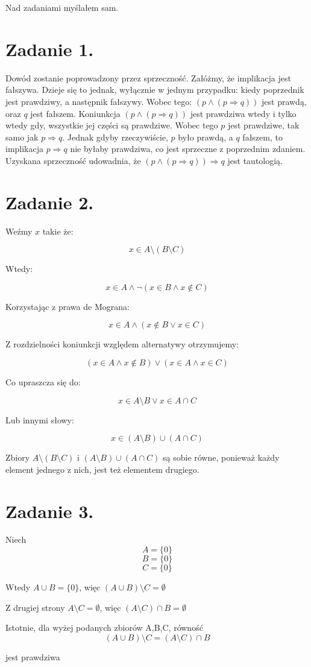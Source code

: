 \documentclass{article}
\begin{document}
\newcommand{\imp}{\Rightarrow}
\newcommand{\lub}{\vee}
\newcommand{\roz}{\setminus}
\newcommand{\zbp}{\emptyset}



\maketitle
Nad zadaniami myślałem sam.
\section*{Zadanie 1.}
Dowód zostanie poprowadzony przez sprzeczność. Załóżmy, że implikacja jest fałszywa. Dzieje się to jednak, wyłącznie w jednym przypadku: kiedy poprzednik jest prawdziwy, a następnik fałszywy. Wobec tego: $(p \wedge ( p \imp q ))$ jest prawdą, oraz $q$ jest fałszem. Koniunkcja $(p \wedge ( p \imp q ))$ jest prawdziwa wtedy i tylko wtedy gdy, wszystkie jej części są prawdziwe. Wobec tego $p$ jest prawdziwe, tak samo jak $p\imp q$. Jednak gdyby rzeczywiście, $p$ było prawdą, a $q$ fałszem, to implikacja $ p \imp q $ nie byłaby prawdziwa, co jest sprzeczne z poprzednim zdaniem. Uzyskana sprzeczność udowadnia, że $(p \wedge ( p \imp q )) \imp q $ jest tautologią. \blacksquare
\section*{Zadanie 2.}
Weźmy $x$ takie że:

\[ x \in A \roz(B\roz C)\]

Wtedy: 

\[ x \in A  \wedge \lnot ( x \in B \wedge x \notin C) \]

Korzystając z prawa de Mograna:

\[ x \in A  \wedge ( x \notin B \lub x \in C) \]

Z rozdzielności koniunkcji względem alternatywy otrzymujemy:

\[(x \in A \wedge x \notin B) \lub (x\in A \wedge x \in C)\]

Co upraszcza się do:

\[x \in A \roz B \lub x \in A \cap C\]

Lub innymi słowy:

\[x \in (A \roz B) \cup (A \cap C)\]

Zbiory $A  \roz ( B \roz C)$ i $ (A \roz B) \cup (A \cap C)$ są sobie równe, ponieważ każdy element jednego z nich, jest też elementem drugiego. \blacksquare

\section*{Zadanie 3.}

Niech \[A = \{0\}\]
\[B=\{0\}\]
\[C= \{0\}\]

Wtedy $ A \cup B = \{0\}$, więc $(A\cup B)\roz C = \zbp$

Z drugiej strony $A \roz C = \zbp$, więc  $(A \roz C)\cap B = \zbp$

Istotnie, dla wyżej podanych zbiorów A,B,C, równość \[ (A\cup B)\roz C = (A\roz C)\cap B\] 

jest prawdziwa
\end{document}
